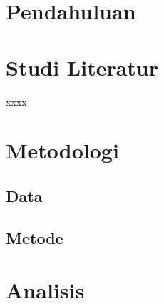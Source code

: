 \documentclass[
  manuscript=article,
  layout=publish,
  year=2026,
  volume=1,
]{den}
\begin{document}
\section{Pendahuluan}\label{pendahuluan}

\section{Studi Literatur}\label{studi-literatur-1}

xxxx

\section{Metodologi}\label{metodologi-1}

\subsection{Data}\label{data-1}

\subsection{Metode}\label{metode}

\section{Analisis}\label{analisis}
\end{document}
